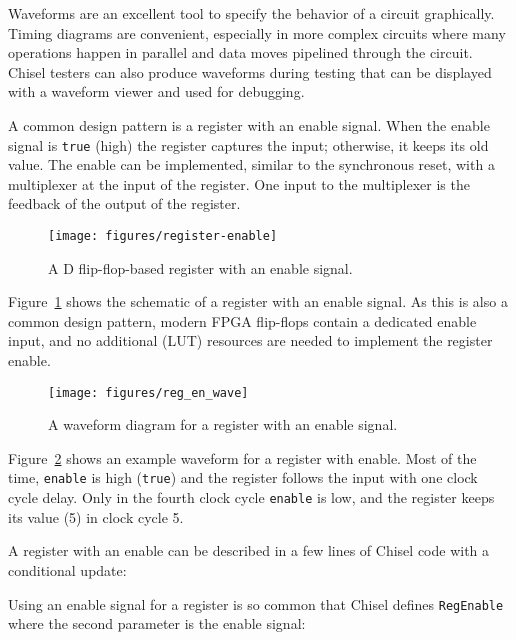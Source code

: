 \documentclass[%
    10pt,
    headinclude, footexclude,
    openright, %
    notitlepage,
    cleardoubleempty,
    headsepline,
    pointlessnumbers,
    bibtotoc, idxtotoc,
    ]{scrbook}
\newcommand{\scale}{0.7}
\newcommand{\code}[1]{{\lstinline[basicstyle=\small\ttfamily]{#1}}}
\begin{document}
Waveforms are an excellent tool to specify the behavior of a circuit graphically.
Timing diagrams are convenient, especially in more complex circuits where many operations happen in parallel
and data moves pipelined through the circuit.
Chisel testers can also produce waveforms during testing that can be displayed
with a waveform viewer and used for debugging.

A common design pattern is a register with an enable signal. When the enable signal
is \code{true} (high) the register captures the input; otherwise, it keeps its old value.
The enable can be implemented, similar to the synchronous reset, with
a multiplexer at the input of the register. One input to the multiplexer is the feedback of the
output of the register.

\begin{figure}
  \centering
  \texttt{[image: figures/register-enable]}
  \caption{A D flip-flop-based register with an enable signal.}
  \label{fig:register-enable}
\end{figure}

Figure~\ref{fig:register-enable} shows the schematic of a register with an enable signal.
As this is also a common design pattern, modern FPGA flip-flops contain a
dedicated enable input, and no additional (LUT) resources are needed to implement
the register enable.

\begin{figure}
  \centering
  \texttt{[image: figures/reg\_en\_wave]}
  \caption{A waveform diagram for a register with an enable signal.}
  \label{fig:register-en-wave}
\end{figure}

Figure~\ref{fig:register-en-wave} shows an example waveform for a register
with enable. Most of the time, \code{enable} is high (\code{true}) and the register
follows the input with one clock cycle delay. Only in the fourth clock cycle
\code{enable} is low, and the register keeps its value (5) in clock cycle 5.

A register with an enable can be described in a few lines of Chisel code
with a conditional update:


\noindent Using an enable signal for a register is so common that Chisel defines
\code{RegEnable} where the second parameter is the enable signal:

\end{document}
